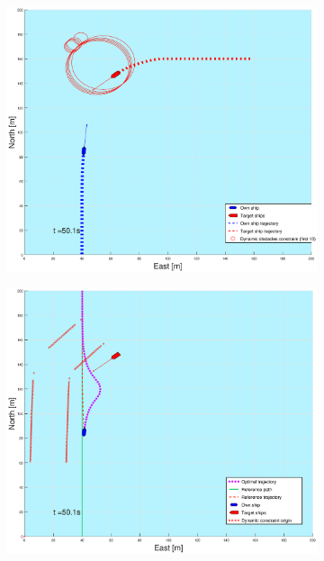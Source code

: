 \begin{figure}[!b]
\begin{subfigure}[b]{0.499\textwidth}
    \end{subfigure}
    \hfill
    \\
    \begin{subfigure}[b]{0.49\textwidth}
        \centering
        \includegraphics[width=\textwidth]{Images/Figures/sving_HO/_Simple_0fig1_time=50}
    \end{subfigure}
    \hfill
    \begin{subfigure}[b]{0.499\textwidth}
        \centering
        \includegraphics[width=\textwidth]{Images/Figures/sving_HO/_Simple_0fig999_time=50}
    \end{subfigure}
    \hfill
\end{figure}%
